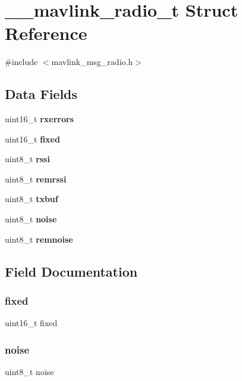 \section{\+\_\+\+\_\+mavlink\+\_\+radio\+\_\+t Struct Reference}
\label{struct____mavlink__radio__t}


{\ttfamily \#include $<$mavlink\+\_\+msg\+\_\+radio.\+h$>$}

\subsection*{Data Fields}
\begin{DoxyCompactItemize}
\item 
uint16\+\_\+t \textbf{ rxerrors}
\item 
uint16\+\_\+t \textbf{ fixed}
\item 
uint8\+\_\+t \textbf{ rssi}
\item 
uint8\+\_\+t \textbf{ remrssi}
\item 
uint8\+\_\+t \textbf{ txbuf}
\item 
uint8\+\_\+t \textbf{ noise}
\item 
uint8\+\_\+t \textbf{ remnoise}
\end{DoxyCompactItemize}


\subsection{Field Documentation}
\mbox{\label{struct____mavlink__radio__t_ae85a62779e8501aa8e3e000540e93b11}} 
\subsubsection{fixed}
{\footnotesize\ttfamily uint16\+\_\+t fixed}

\mbox{\label{struct____mavlink__radio__t_a754a5ffa5dae1a54bd9c7a53fd5ccba0}} 
\subsubsection{noise}
{\footnotesize\ttfamily uint8\+\_\+t noise}

